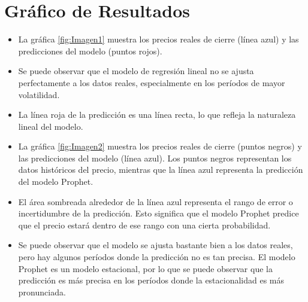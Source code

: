 \section{Gráfico de Resultados}
\begin{itemize}
    \item	La gráfica \ref{fig:Imagen1} muestra los precios reales de cierre (línea azul) y las predicciones del modelo (puntos rojos).
\item	Se puede observar que el modelo de regresión lineal no se ajusta perfectamente a los datos reales, especialmente en los períodos de mayor volatilidad.
\item	La línea roja de la predicción es una línea recta, lo que refleja la naturaleza lineal del modelo.

\end{itemize}

\begin{itemize}
    \item	La gráfica \ref{fig:Imagen2} muestra los precios reales de cierre (puntos negros) y las predicciones del modelo (línea azul). Los puntos negros representan los datos históricos del precio, mientras que la línea azul representa la predicción del modelo Prophet.
\item	El área sombreada alrededor de la línea azul representa el rango de error o incertidumbre de la predicción. Esto significa que el modelo Prophet predice que el precio estará dentro de ese rango con una cierta probabilidad.
\item	Se puede observar que el modelo se ajusta bastante bien a los datos reales, pero hay algunos períodos donde la predicción no es tan precisa. El modelo Prophet es un modelo estacional, por lo que se puede observar que la predicción es más precisa en los períodos donde la estacionalidad es más pronunciada.

\end{itemize}

